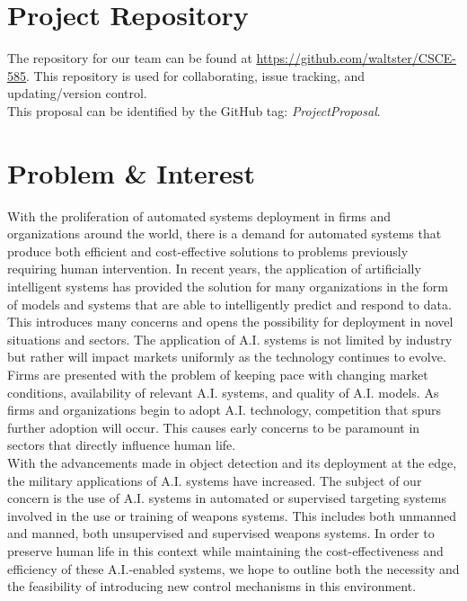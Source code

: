 \documentclass[12pt,twoside]{article}
\begin{document}

\tableofcontents
\newpage

\section{Project Repository}
The repository for our team can be found at \href{https://github.com/waltster/CSCE-585}{https://github.com/waltster/CSCE-585}. This repository is used for collaborating, issue tracking, and updating/version control.\\

This proposal can be identified by the GitHub tag: \emph{ProjectProposal}.

\section{Problem \& Interest}
With the proliferation of automated systems deployment in firms and organizations around the world, there is a demand for automated systems that produce both efficient and cost-effective solutions to problems previously requiring human intervention. In recent years, the application of artificially intelligent systems has provided the solution for many organizations in the form of models and systems that are able to intelligently predict and respond to data. This introduces many concerns and opens the possibility for deployment in novel situations and sectors. The application of A.I. systems is not limited by industry but rather will impact markets uniformly as the technology continues to evolve. Firms are presented with the problem of keeping pace with changing market conditions, availability of relevant A.I. systems, and quality of A.I. models. As firms and organizations begin to adopt A.I. technology, competition that spurs further adoption will occur. This causes early concerns to be paramount in sectors that directly influence human life.\\

With the advancements made in object detection and its deployment at the edge, the military applications of A.I. systems have increased. The subject of our concern is the use of A.I. systems in automated or supervised targeting systems involved in the use or training of weapons systems. This includes both unmanned and manned, both unsupervised and supervised weapons systems. In order to preserve human life in this context while maintaining the cost-effectiveness and efficiency of these A.I.-enabled systems, we hope to outline both the necessity and the feasibility of introducing new control mechanisms in this environment.\\
\end{document}
